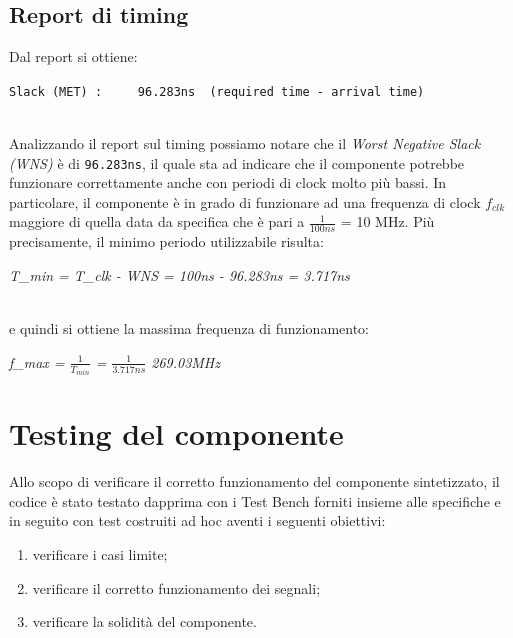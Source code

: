 \documentclass{article}
\begin{document}
\subsection{Report di timing}
Dal report si ottiene:
\begin{center}
    \verb|Slack (MET) :     96.283ns  (required time - arrival time)              |\\
\end{center}
\\
Analizzando il report sul timing possiamo notare che il \textit{Worst Negative Slack (WNS)} è di \verb|96.283ns|, il quale sta ad indicare che il componente potrebbe funzionare correttamente anche con periodi di clock molto più bassi. In particolare, il componente è in grado di funzionare ad una frequenza di clock \textit{$f_{clk}$} maggiore di quella data da specifica che è pari a \(\frac{1}{100ns}\) = 10 MHz. Più precisamente, il minimo periodo utilizzabile risulta:
\begin{center}
    \textit{T_{min} = T_{clk} - WNS = 100ns - 96.283ns = 3.717ns}\\
\end{center}
\\
e quindi si ottiene la massima frequenza di funzionamento:
\begin{center}
    \textit{f_{max} = \(\frac{1}{T_{min}}\) = \(\frac{1}{3.717ns}\) \approx 269.03MHz}\\
\end{center}






\newpage
\section{Testing del componente}
Allo scopo di verificare il corretto funzionamento del componente sintetizzato, il codice è stato testato dapprima con i Test Bench forniti insieme alle specifiche e in seguito con test costruiti ad hoc aventi i seguenti obiettivi:
\vspace{3.5pt}
\begin{enumerate}
    \item verificare i casi limite;
    \item verificare il corretto funzionamento dei segnali;
    \item verificare la solidità del componente.
\end{enumerate}
\vspace{3.5pt}
\end{document}
